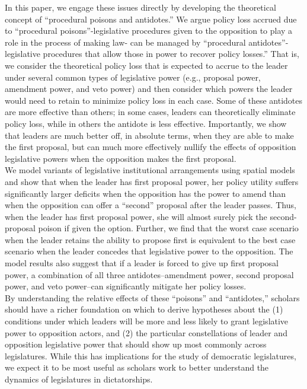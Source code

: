 \documentclass[12pt]{article}
\theoremstyle{plain}		      \newtheorem{assn}{Assumption}
\theoremstyle{plain}		      \newtheorem{prop}{Proposition}
\theoremstyle{plain}		      \newtheorem{lemma}{Lemma}
\theoremstyle{plain}	          \newtheorem{imp}{Implication}
\theoremstyle{plain}	          \newtheorem{hyp}{Hypothesis}
\theoremstyle{definition}		  \newtheorem{defn}{Definition}
\theoremstyle{remark}	          \newtheorem{rem}{Remark}
\theoremstyle{definition}         \newtheorem{case}{Case}
\begin{document}
\indent In this paper, we engage these issues directly by developing the theoretical concept of ``procedural poisons and antidotes.'' We argue policy loss accrued due to ``procedural poisons''-legislative procedures given to the opposition to play a role in the process of making law- can be managed by ``procedural antidotes''- legislative procedures that allow those in power to recover policy losses.'' That is, we consider the theoretical policy loss that is expected to accrue to the leader under several common types of legislative power (e.g., proposal power, amendment power, and veto power) and then consider which powers the leader would need to retain to minimize policy loss in each case. Some of these antidotes are more effective than others; in some cases, leaders can theoretically eliminate policy loss, while in others the antidote is less effective. Importantly, we show that leaders are much better off, in absolute terms, when they are able to make the first proposal, but can much more effectively nullify the effects of opposition legislative powers when the opposition makes the first proposal.
\\
\indent We model variants of legislative institutional arrangements using spatial models and show that when the leader has first proposal power, her policy utility suffers significantly larger deficits when the opposition has the power to amend than when the opposition can offer a ``second'' proposal after the leader passes. Thus, when the leader has first proposal power, she will almost surely pick the second-proposal poison if given the option. Further, we find that the worst case scenario when the leader retains the ability to propose first is equivalent to the best case scenario when the leader concedes that legislative power to the opposition. The model results also suggest that if a leader is forced to give up first proposal power, a combination of all three antidotes--amendment power, second proposal power, and veto power--can significantly mitigate her policy losses.
\\
\indent By understanding the relative effects of these ``poisons'' and ``antidotes,'' scholars should have a richer foundation on which to derive hypotheses about the (1) conditions under which leaders will be more and less likely to grant legislative power to opposition actors, and (2) the particular constellations of leader and opposition legislative power that should show up most commonly across legislatures. While this has implications for the study of democratic legislatures, we expect it to be most useful as scholars work to better understand the dynamics of legislatures in dictatorships.
\end{document}
